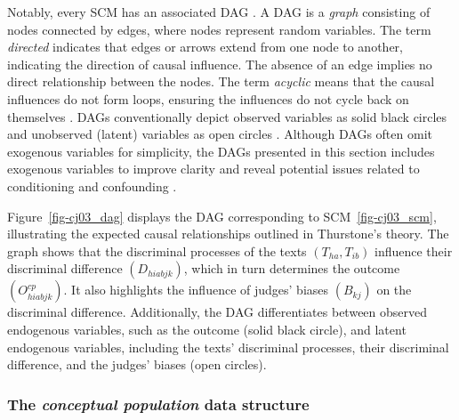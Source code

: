 \documentclass[
  authoryear,
  review,
  1p]{elsarticle}
\begin{document}
Notably, every SCM has an associated DAG
\citep{Pearl_et_al_2016, Cinelli_et_al_2020}. A DAG is a \emph{graph}
consisting of nodes connected by edges, where nodes represent random
variables. The term \emph{directed} indicates that edges or arrows
extend from one node to another, indicating the direction of causal
influence. The absence of an edge implies no direct relationship between
the nodes. The term \emph{acyclic} means that the causal influences do
not form loops, ensuring the influences do not cycle back on themselves
\citep{McElreath_2020}. DAGs conventionally depict observed variables as
solid black circles and unobserved (latent) variables as open circles
\citep{Morgan_et_al_2014}. Although DAGs often omit exogenous variables
for simplicity, the DAGs presented in this section includes exogenous
variables to improve clarity and reveal potential issues related to
conditioning and confounding \citep{Cinelli_et_al_2020}.

Figure~\ref{fig-cj03_dag} displays the DAG corresponding to
SCM~\ref{fig-cj03_scm}, illustrating the expected causal relationships
outlined in Thurstone's theory. The graph shows that the discriminal
processes of the texts \((T_{ha}, T_{ib})\) influence their discriminal
difference \((D_{hiabjk})\), which in turn determines the outcome
\((O^{cp}_{hiabjk})\). It also highlights the influence of judges'
biases \((B_{kj})\) on the discriminal difference. Additionally, the DAG
differentiates between observed endogenous variables, such as the
outcome (solid black circle), and latent endogenous variables, including
the texts' discriminal processes, their discriminal difference, and the
judges' biases (open circles).

\subsubsection{\texorpdfstring{The \emph{conceptual population} data
structure}{The conceptual population data structure}}\label{sec-theory-theoretical_P2}
\end{document}
